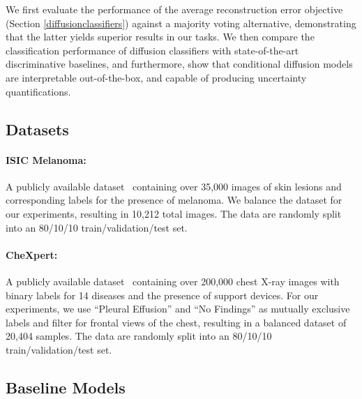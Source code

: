 We first evaluate the performance of the average reconstruction error objective (Section \ref{diffusionclassifiers}) against a majority voting alternative, demonstrating that the latter yields superior results in our tasks. We then compare the classification performance of diffusion classifiers with state-of-the-art discriminative baselines, and furthermore, show that conditional diffusion models are interpretable out-of-the-box, and capable of producing uncertainty quantifications.

\subsection{Datasets}

\paragraph{ISIC Melanoma:} A publicly available dataset~\cite{Rotemberg2020APD} containing over 35,000 images of skin lesions and corresponding labels for the presence of melanoma. We balance the dataset for our experiments, resulting in 10,212 total images. The data are randomly split into an 80/10/10 train/validation/test set.

\paragraph{CheXpert:} A publicly available dataset~\cite{irvin2019chexpert} containing over 200,000 chest X-ray images with binary labels for 14 diseases and the presence of support devices. For our experiments, we use ``Pleural Effusion'' and ``No Findings'' as mutually exclusive labels and filter for frontal views of the chest, resulting in a balanced dataset of 20,404 samples. The data are randomly split into an 80/10/10 train/validation/test set.

\begin{comment}
    \textbf{Failure Sets}: To investigate how different classifier architectures complement one another, we construct a ``failure set'' for each model—defined as the subset of the CheXpert validation data where the model achieves zero accuracy. By evaluating the performance of models on various failure sets, we gain insights into whether different architectures, methods, and perspectives of classification can compensate for limitations of their counterparts.
\end{comment}

\subsection{Baseline Models}

